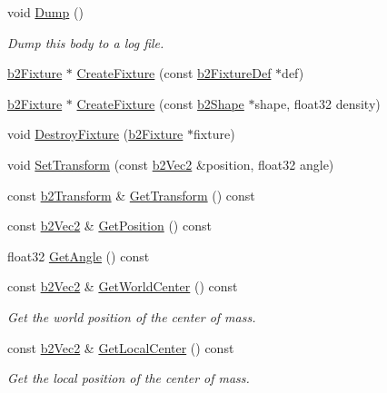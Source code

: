 \begin{DoxyCompactItemize}
\mbox{\label{classb2Body_ac9e482f7d9df92801c24e79a7e751d06}} 
void \hyperlink{classb2Body_ac9e482f7d9df92801c24e79a7e751d06}{Dump} ()
\begin{DoxyCompactList}\small\item\em Dump this body to a log file. \end{DoxyCompactList}\item 
\hyperlink{classb2Fixture}{b2\+Fixture} $\ast$ \hyperlink{classb2Body_a40dda91b34418bb40e31e2db9b1b76a5}{Create\+Fixture} (const \hyperlink{structb2FixtureDef}{b2\+Fixture\+Def} $\ast$def)
\item 
\hyperlink{classb2Fixture}{b2\+Fixture} $\ast$ \hyperlink{classb2Body_a9bdbbc58d1cc51aec51a978174a2ba48}{Create\+Fixture} (const \hyperlink{classb2Shape}{b2\+Shape} $\ast$shape, float32 density)
\item 
void \hyperlink{classb2Body_a856d1df86b7bded91f02d8cfcaea1c2f}{Destroy\+Fixture} (\hyperlink{classb2Fixture}{b2\+Fixture} $\ast$fixture)
\item 
void \hyperlink{classb2Body_a4686f32bbce5723761e9719c706eca11}{Set\+Transform} (const \hyperlink{structb2Vec2}{b2\+Vec2} \&position, float32 angle)
\item 
const \hyperlink{structb2Transform}{b2\+Transform} \& \hyperlink{classb2Body_a23d09b0b15585eb9627007925fddf317}{Get\+Transform} () const
\item 
const \hyperlink{structb2Vec2}{b2\+Vec2} \& \hyperlink{classb2Body_ae44c1dc2f64fd42af1b77ed0843dd886}{Get\+Position} () const
\item 
float32 \hyperlink{classb2Body_a20b9c8d0d722edf3af281034d37bd534}{Get\+Angle} () const
\item 
\mbox{\label{classb2Body_ab12aaf56e3565813780b1514a796d2b1}} 
const \hyperlink{structb2Vec2}{b2\+Vec2} \& \hyperlink{classb2Body_ab12aaf56e3565813780b1514a796d2b1}{Get\+World\+Center} () const
\begin{DoxyCompactList}\small\item\em Get the world position of the center of mass. \end{DoxyCompactList}\item 
\mbox{\label{classb2Body_a29cd97aa019450c9ea16a59904d8d465}} 
const \hyperlink{structb2Vec2}{b2\+Vec2} \& \hyperlink{classb2Body_a29cd97aa019450c9ea16a59904d8d465}{Get\+Local\+Center} () const
\begin{DoxyCompactList}\small\item\em Get the local position of the center of mass. \end{DoxyCompactList}\item 

\end{DoxyCompactItemize}
